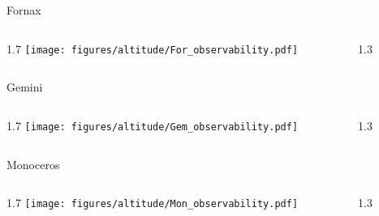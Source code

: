 \documentclass[final]{beamer}
\newlength{\colwidth}
\begin{document}
\begin{frame}[t]{}

  \Large{Fornax}
  \begin{columns}[T]
      \begin{column}{1.7\colwidth}
          \centering
          \texttt{[image: figures/altitude/For\_observability.pdf]}
      \end{column}
      \begin{column}{1.3\colwidth}
      \Large
      
      \end{column}
  \end{columns}

  \Large{Gemini}
  \begin{columns}[T]
      \begin{column}{1.7\colwidth}
          \centering
          \texttt{[image: figures/altitude/Gem\_observability.pdf]}
      \end{column}
      \begin{column}{1.3\colwidth}
      \Large
      
      \end{column}
  \end{columns}

  \Large{Monoceros}
  \begin{columns}[T]
      \begin{column}{1.7\colwidth}
          \centering
          \texttt{[image: figures/altitude/Mon\_observability.pdf]}
      \end{column}
      \begin{column}{1.3\colwidth}
      \Large
      
      \end{column}
  \end{columns}
\end{frame}

\end{document}
